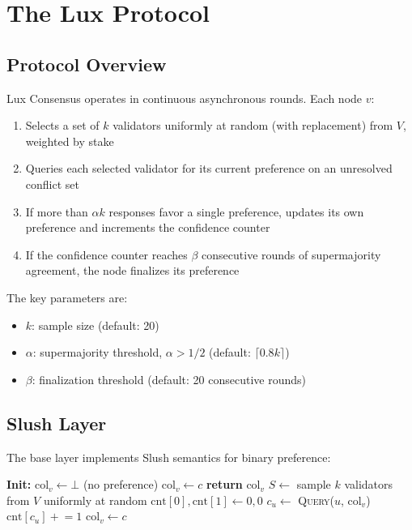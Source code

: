 \section{The Lux Protocol}

\label{sec:protocol}

\subsection{Protocol Overview}

Lux Consensus operates in continuous asynchronous rounds. Each node $v$:
\begin{enumerate}
\item Selects a set of $k$ validators uniformly at random (with replacement) from $V$,
weighted by stake
\item Queries each selected validator for its current preference on an unresolved conflict set
\item If more than $\alpha k$ responses favor a single preference, updates its own preference
and increments the confidence counter
\item If the confidence counter reaches $\beta$ consecutive rounds of supermajority agreement,
the node finalizes its preference
\end{enumerate}

The key parameters are:
\begin{itemize}
\item $k$: sample size (default: 20)
\item $\alpha$: supermajority threshold, $\alpha > 1/2$ (default: $\lceil 0.8k \rceil$)
\item $\beta$: finalization threshold (default: 20 consecutive rounds)
\end{itemize}

\subsection{Slush Layer}

The base layer implements Slush semantics for binary preference:

\begin{algorithm}
\caption{Slush: Binary Preference Gossip}
\label{alg:slush}
\begin{algorithmic}[1]
\State \textbf{Init:} $\text{col}_v \leftarrow \bot$ (no preference)
        \State $\text{col}_v \leftarrow c$
    \EndIf
    \State \textbf{return} $\text{col}_v$
\EndProcedure
{}
        \State $S \leftarrow$ sample $k$ validators from $V$ uniformly at random
        \State $\text{cnt}[0], \text{cnt}[1] \leftarrow 0, 0$
            \State $c_u \leftarrow$ \textsc{Query}($u$, $\text{col}_v$)
            \State $\text{cnt}[c_u] \mathrel{+}= 1$
        \EndFor
            \State $\text{col}_v \leftarrow c$
        \EndIf
    \EndWhile
\EndProcedure
\end{algorithmic}
\end{algorithm}

